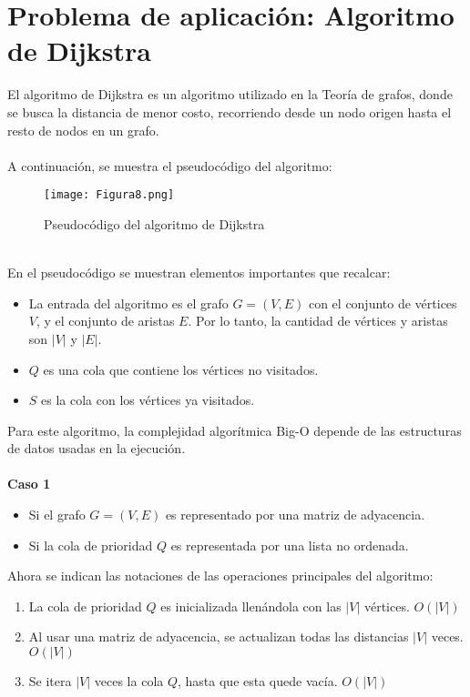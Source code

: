 \documentclass{article}
\begin{document}
\section{Problema de aplicación: Algoritmo de Dijkstra}
El algoritmo de Dijkstra es un algoritmo utilizado en la Teoría de grafos, donde se busca la distancia de menor costo, recorriendo desde un nodo origen hasta el resto de nodos en un grafo. 
\\\\
A continuación, se muestra el pseudocódigo del algoritmo:
\\
\begin{figure}[h]
    \centering
    \texttt{[image: Figura8.png]}
    \caption{Pseudocódigo del algoritmo de Dijkstra}
    \label{fig:8}
\end{figure}
\\
En el pseudocódigo se muestran elementos importantes que recalcar:
\begin{itemize}
    \item La entrada del algoritmo es el grafo $G=(V,E)$ con el conjunto de vértices $V$, y el conjunto de aristas $E$. Por lo tanto, la cantidad de vértices y aristas son $|V|$ y $|E|$.
    \item $Q$ es una cola que contiene los vértices no visitados. 
    \item $S$ es la cola con los vértices ya visitados. 
\end{itemize}
Para este algoritmo, la complejidad algorítmica Big-O depende de las estructuras de datos usadas en la ejecución. 
\\
\\
\textbf{Caso 1}
\begin{itemize}
    \item Si el grafo $G=(V,E)$ es representado por una matriz de adyacencia.
    \item Si la cola de prioridad $Q$ es representada por una lista no ordenada. 
\end{itemize}
Ahora se indican las notaciones de las operaciones principales del algoritmo: 
\begin{enumerate}
    \item La cola de prioridad $Q$ es inicializada llenándola con las $|V|$ vértices. \textbf{$O(|V|)$} 
    \item Al usar una matriz de adyacencia, se actualizan todas las distancias $|V|$ veces. \textbf{$O(|V|)$} 
    \item Se itera $|V|$ veces la cola $Q$, hasta que esta quede vacía. \textbf{$O(|V|)$} 
\end{enumerate}
\end{document}

